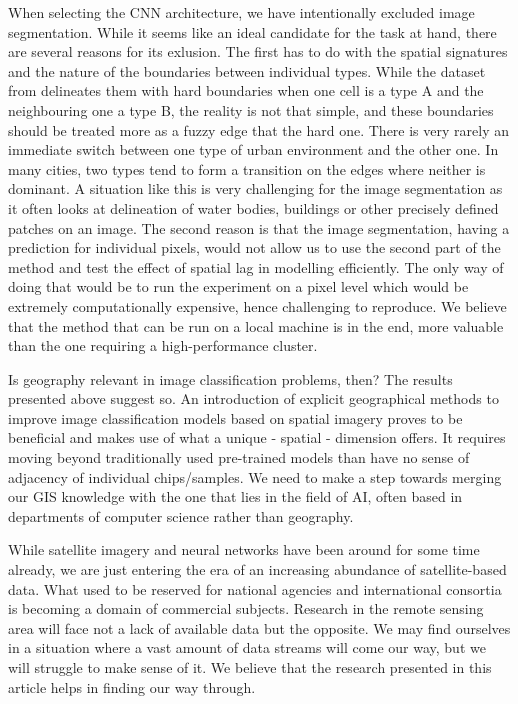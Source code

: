 \documentclass[]{interact}
\theoremstyle{plain}%
\theoremstyle{definition}
\theoremstyle{remark}
\begin{document}
When selecting the CNN architecture, we have intentionally excluded image
segmentation. While it seems like an ideal candidate for the task at hand, there are
several reasons for its exlusion. The first has to do with the spatial signatures and the
nature of the boundaries between individual types. While the dataset from
\cite{fleischmann2022geographical} delineates them with hard boundaries when one cell
is a type A and the neighbouring one a type B, the reality is not that simple, and these
boundaries should be treated more as a fuzzy edge that the hard one. There is very rarely an immediate
switch between one type of urban environment and the other one. In many cities, two
types tend to form a transition on the edges where neither is dominant. A situation like
this is very challenging for the image segmentation as it often looks at delineation of water bodies, buildings or other precisely defined patches on an image. The second reason is that the image
segmentation, having a prediction for individual pixels, would not allow us to use the
second part of the method and test the effect of spatial lag in modelling efficiently. The only
way of doing that would be to run the experiment on a pixel level which would be
extremely computationally expensive, hence challenging to reproduce. We believe that the
method that can be run on a local machine is in the end, more valuable than the one
requiring a high-performance cluster.


Is geography relevant in image classification problems, then? The results presented
above suggest so. An introduction of explicit geographical methods to improve image
classification models based on spatial imagery proves to be beneficial and makes use of what a
unique - spatial - dimension offers. It requires moving beyond traditionally used
pre-trained models than have no sense of adjacency of individual chips/samples. We need
to make a step towards merging our GIS knowledge with the one that lies in the field of
AI, often based in departments of computer science rather than geography.

While satellite imagery and neural networks have been around for some time already, we
are just entering the era of an increasing abundance of satellite-based data. What used
to be reserved for national agencies and international consortia is becoming a domain of
commercial subjects. Research in the remote sensing area will face not a lack of
available data but the opposite. We may find ourselves in a situation where a vast
amount of data streams will come our way, but we will struggle to make sense of it. We
believe that the research presented in this article helps in finding our way through.
\end{document}
